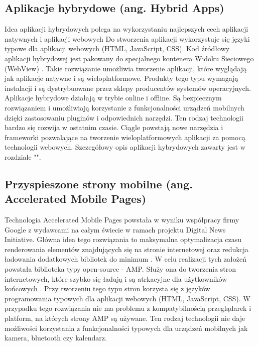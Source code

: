 \documentclass[a4paper,12pt,twoside,openany]{report}
\begin{document}
\subsection*{Aplikacje hybrydowe (ang. Hybrid Apps)}
\noindent Idea aplikacji hybrydowych polega na wykorzystaniu najlepszych cech aplikacji natywnych i aplikacji webowych Do stworzenia aplikacji wykorzystuje się języki typowe dla aplikacji webowych (HTML, JavaScript, CSS). Kod źródłowy aplikacji hybrydowej jest pakowany do specjalnego kontenera Widoku Sieciowego (WebView) \cite{hybrid}. Takie rozwiązanie umożliwia tworzenie aplikacji, które wyglądają jak aplikacje natywne i są wieloplatformowe. Produkty tego typu wymagają instalacji i są dystrybuowane przez sklepy producentów systemów operacyjnych. Aplikacje hybrydowe działają w trybie online i offline. Są bezpiecznym rozwiązaniem i umożliwiają korzystanie z funkcjonalno\'sci urządzeń mobilnych dzięki zastosowaniu pluginów i odpowiednich narzędzi. Ten rodzaj technologii bardzo się rozwija w ostatnim czasie. Ciągle powstają nowe narzędzia i frameworki pozwalające na tworzenie wieloplatformowych aplikacji za pomocą technologii webowych. Szczegółowy opis aplikacji hybrydowych zawarty jest w rozdziale "".

\subsection*{Przyspieszone strony mobilne (ang. Accelerated Mobile Pages)}
\noindent Technologia Accelerated Mobile Pages powstała w wyniku współpracy firmy Google z wydawcami na całym \'swiecie w ramach projektu Digital News Initiative. Główna idea tego rozwiązania to maksymalna optymalizacja czasu renderowania elementów znajdujących się na stronie internetowej oraz redukcja ładowania dodatkowych bibliotek do minimum \cite{amp}. W celu realizacji tych założeń powstała biblioteka typy open-source - AMP. Służy ona do tworzenia stron internetowych, które szybko się ładują i są atrkacyjne dla użytkowników końcowych \cite{amp2}. Przy tworzeniu tego typu stron korzysta się z języków programowania typowych dla aplikacji webowych (HTML, JavaScript, CSS). W przypadku tego rozwiązania nie ma problemu z kompatybilno\'scią przeglądarek i platform, na których strony AMP są używane. Ten rodzaj technologii nie daje możliwo\'sci korzystania z funkcjonalno\'sci typowych dla urządzeń mobilnych jak kamera, bluetooth czy kalendarz.



\end{document}
